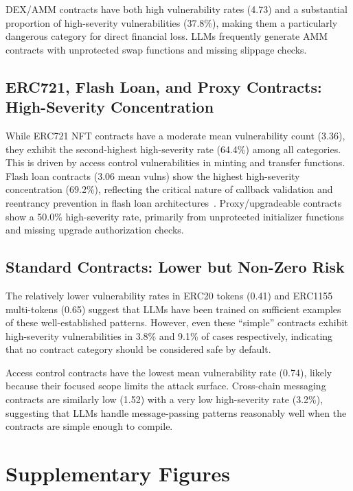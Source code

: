 DEX/AMM contracts have both high vulnerability rates (4.73) and a substantial proportion of high-severity vulnerabilities (37.8\%), making them a particularly dangerous category for direct financial loss. LLMs frequently generate AMM contracts with unprotected swap functions and missing slippage checks.

\subsection{ERC721, Flash Loan, and Proxy Contracts: High-Severity Concentration}

While ERC721 NFT contracts have a moderate mean vulnerability count (3.36), they exhibit the second-highest high-severity rate (64.4\%) among all categories. This is driven by access control vulnerabilities in minting and transfer functions. Flash loan contracts (3.06 mean vulns) show the highest high-severity concentration (69.2\%), reflecting the critical nature of callback validation and reentrancy prevention in flash loan architectures~\cite{qin2021attacking}. Proxy/upgradeable contracts show a 50.0\% high-severity rate, primarily from unprotected initializer functions and missing upgrade authorization checks.

\subsection{Standard Contracts: Lower but Non-Zero Risk}

The relatively lower vulnerability rates in ERC20 tokens (0.41) and ERC1155 multi-tokens (0.65) suggest that LLMs have been trained on sufficient examples of these well-established patterns. However, even these ``simple'' contracts exhibit high-severity vulnerabilities in 3.8\% and 9.1\% of cases respectively, indicating that no contract category should be considered safe by default.

Access control contracts have the lowest mean vulnerability rate (0.74), likely because their focused scope limits the attack surface. Cross-chain messaging contracts are similarly low (1.52) with a very low high-severity rate (3.2\%), suggesting that LLMs handle message-passing patterns reasonably well when the contracts are simple enough to compile.

\section{Supplementary Figures}
\label{sec:appendix_figures}

